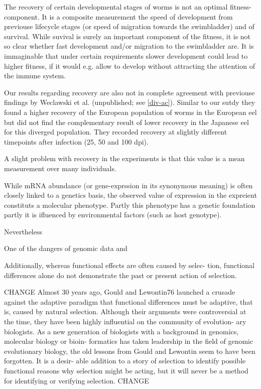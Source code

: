 The recovery of certain developmental stages of worms is not an
optimal fitness-component. It is a composite measurement the speed of
development from previouse lifecycle stages (or speed of migration
towards the swimbladder) and of survival. While suvival is surely an
important component of the fitness, it is not so clear whether fast
development and/or migration to the swimbladder are. It is immaginable
that under certain requirements slower development could lead to
higher fitness, if it would e.g. allow to develop without attracting
the attention of the immune system.

Our results regarding recovery are also not in complete agreement with
previouse findings by Weclawski et al. (unpublished; see
\ref{div-ac}). Similar to our sutdy they found a higher recovery of
the European population of worms in the European eel but did not find
the complementary result of lower recovery in the Japanese eel for
this diverged population. They recorded recovery at slightly different
timepoints after infection (25, 50 and 100 dpi).

A slight problem with recovery in the experiments is that this value
is a mean measurement over many individuals.

While mRNA abundance (or gene-exprssion in its synonymous meaning) is
often closely linked to a genetics basis, the observed value of
expression in the expreient constituts a molecular phenotype. Partly
this phenotype has a genetic foundation partly it is ifluenced by
environmental factors (such as host genotype).

Nevertheless

One of the dangers of genomic data and 

Additionally, whereas functional effects are often caused by selec-
tion, functional differences alone do not demonstrate the past or
present action of selection.

CHANGE
Almost 30 years ago, Gould and Lewontin76 launched a crusade against
the adaptive paradigm that functional differences must be adaptive,
that is, caused by natural selection. Although their arguments were
controversial at the time, they have been highly influential on the
community of evolution- ary biologists. As a new generation of
biologists with a background in genomics, molecular biology or bioin-
formatics has taken leadership in the field of genomic evolutionary
biology, the old lessons from Gould and Lewontin seem to have been
forgotten. It is a desir- able addition to a story of selection to
identify possible functional reasons why selection might be acting,
but it will never be a method for identifying or verifying selection.
CHANGE

